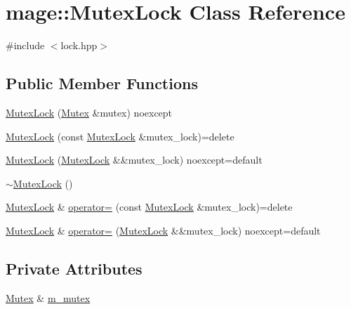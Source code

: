 \hypertarget{classmage_1_1_mutex_lock}{}\section{mage\+:\+:Mutex\+Lock Class Reference}
\label{classmage_1_1_mutex_lock}


{\ttfamily \#include $<$lock.\+hpp$>$}

\subsection*{Public Member Functions}
\begin{DoxyCompactItemize}
\item 
\hyperlink{classmage_1_1_mutex_lock_a6759bb3a22b81aa5f3e82f7b7757024f}{Mutex\+Lock} (\hyperlink{classmage_1_1_mutex}{Mutex} \&mutex) noexcept
\item 
\hyperlink{classmage_1_1_mutex_lock_a20b0f44c31bcb2040cbf23f071870af9}{Mutex\+Lock} (const \hyperlink{classmage_1_1_mutex_lock}{Mutex\+Lock} \&mutex\+\_\+lock)=delete
\item 
\hyperlink{classmage_1_1_mutex_lock_a38bbba48500fbf6d0c0e6864f3d8aa7f}{Mutex\+Lock} (\hyperlink{classmage_1_1_mutex_lock}{Mutex\+Lock} \&\&mutex\+\_\+lock) noexcept=default
\item 
\hyperlink{classmage_1_1_mutex_lock_a2631e8878646b2d25b136b6adb55d553}{$\sim$\+Mutex\+Lock} ()
\item 
\hyperlink{classmage_1_1_mutex_lock}{Mutex\+Lock} \& \hyperlink{classmage_1_1_mutex_lock_a739909161a9a9ca0fc8143ac84967765}{operator=} (const \hyperlink{classmage_1_1_mutex_lock}{Mutex\+Lock} \&mutex\+\_\+lock)=delete
\item 
\hyperlink{classmage_1_1_mutex_lock}{Mutex\+Lock} \& \hyperlink{classmage_1_1_mutex_lock_a1fcd5e6856dfbe643aba405dd23ffbe5}{operator=} (\hyperlink{classmage_1_1_mutex_lock}{Mutex\+Lock} \&\&mutex\+\_\+lock) noexcept=default
\end{DoxyCompactItemize}
\subsection*{Private Attributes}
\begin{DoxyCompactItemize}
\item 
\hyperlink{classmage_1_1_mutex}{Mutex} \& \hyperlink{classmage_1_1_mutex_lock_a1c796e1e66bd49007fe746d1425b82f4}{m\+\_\+mutex}
\end{DoxyCompactItemize}


